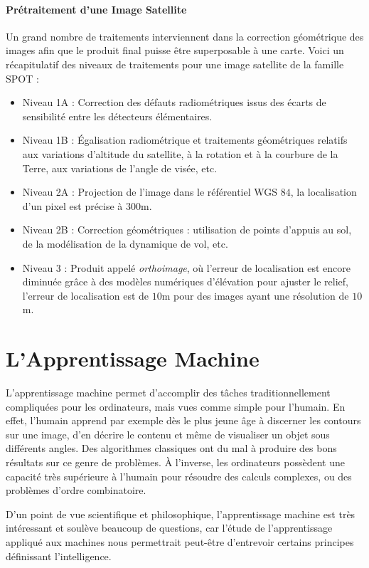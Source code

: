 \documentclass[a4paper, 10pt]{report}
\begin{document}
\subsubsection{Prétraitement d'une Image Satellite}
Un grand nombre de traitements interviennent dans la correction géométrique des images afin que le produit final puisse être superposable à une carte.
Voici un récapitulatif des niveaux de traitements pour une image satellite de la famille SPOT :
\begin{itemize}
	\item Niveau 1A : Correction des défauts radiométriques issus des écarts de sensibilité entre les détecteurs élémentaires.
	\item Niveau 1B : Égalisation radiométrique et traitements géométriques relatifs aux variations d'altitude du satellite, à la rotation et à la courbure de la Terre, aux variations de l'angle de visée, etc.
	\item Niveau 2A : Projection de l'image dans le référentiel WGS $84$, la localisation d'un pixel est précise à $300$m.
	\item Niveau 2B : Correction géométriques : utilisation de points d'appuis au sol, de la modélisation de la dynamique de vol, etc.
	\item Niveau 3 : Produit appelé \emph{orthoimage}, où l'erreur de localisation est encore diminuée grâce à des modèles numériques d'élévation pour ajuster le relief, l'erreur de localisation est de $10$m pour des images ayant une résolution de $10$m.
\end{itemize}

\chapter{L'Apprentissage Machine}
L'apprentissage machine permet d'accomplir des tâches traditionnellement compliquées pour les ordinateurs, mais vues comme simple pour l'humain.
En effet, l'humain apprend par exemple dès le plus jeune âge à discerner les contours sur une image, d'en décrire le contenu et même de visualiser un objet sous différents angles. Des algorithmes classiques ont du mal à produire des bons résultats sur ce genre de problèmes.
À l'inverse, les ordinateurs possèdent une capacité très supérieure à l'humain pour résoudre des calculs complexes, ou des problèmes d'ordre combinatoire.

D'un point de vue scientifique et philosophique, l'apprentissage machine est très intéressant et soulève beaucoup de questions, car l'étude de l'apprentissage appliqué aux machines nous permettrait peut-être d'entrevoir certains principes définissant l'intelligence.
\end{document}
